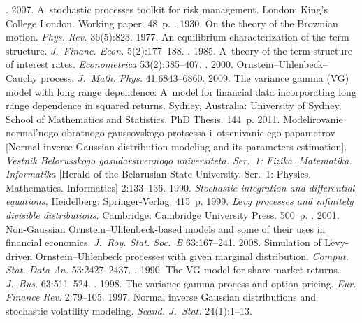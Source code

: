   \begin{multicols}{2}

\renewcommand{\bibname}{\protect\rmfamily References}

{\small\frenchspacing
 {%
 \begin{thebibliography}{99}

. 2007. 
{A~stochastic processes toolkit for risk management}. 
London: King's College London.  Working paper. 48~p.
. 1930. On the theory of the Brownian motion. 
\textit{Phys. Rev.} 36(5):823.
 1977. An equilibrium characterization of the term structure. 
\textit{J.~Financ. Econ.} 5(2):177--188.
. 1985. 
A~theory of the term structure of interest rates. \textit{Econometrica} 53(2):385--407.
. 2000. Ornstein--Uhlenbeck--Cauchy process. 
\textit{J.~Math. Phys.} 41:6843--6860.
 2009. The variance gamma (VG) model with long range dependence: 
A~model for financial data incorporating long range dependence in squared returns.
Sydney, Australia: University of Sydney, School of Mathematics and Statistics. 
 PhD Thesis. 144~p.
 2011. Modelirovanie normal'nogo obratnogo gaussovskogo 
protsessa i~otsenivanie ego papametrov [Normal inverse Gaussian distribution 
modeling and its parameters estimation]. 
\textit{Vestnik Belorusskogo gosudarstvennogo universiteta. Ser.~1: Fizika. Matematika. 
Informatika} [Herald of the Belarusian State University. Ser.~1: 
Physics. Mathematics. Informatics] 2:133--136. 
 1990. 
\textit{Stochastic integration and differential equations.}  
Heidelberg: Springer-Verlag. 415~p.
 1999. \textit{L$\acute{\mbox{e}}$vy processes and infinitely divisible 
distributions.}  Cambridge: Cambridge University Press. 500~p.
. 2001. Non-Gaussian 
Ornstein--Uhlenbeck-based models and some of their uses in financial economics. 
\textit{J.~Roy. Stat. Soc.~B} 63:167--241.
 2008. Simulation of L$\acute{\mbox{e}}$vy-driven 
Ornstein--Uhlenbeck processes with given marginal distribution. 
\textit{Comput. Stat. Data An.} 53:2427--2437.
. 1990. 
The VG model for share market returns. \textit{J.~Bus.} 63:511--524.
. 1998. 
The variance gamma process and option pricing. \textit{Eur. Finance Rev.} 2:79--105.
 1997. 
Normal inverse Gaussian distributions and stochastic volatility modeling. 
\textit{Scand. J.~Stat.} 24(1):1--13.


\end{thebibliography}}}
\end{multicols}
